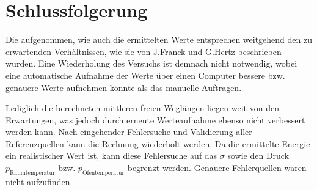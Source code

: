 \section{Schlussfolgerung}
	
	Die aufgenommen, wie auch die ermittelten Werte entsprechen weitgehend den zu erwartenden Verhältnissen, wie sie von J.Franck und G.Hertz beschrieben wurden.	 
	Eine Wiederholung des Versuchs ist demnach nicht notwendig, wobei eine automatische Aufnahme der Werte über einen Computer bessere bzw. genauere Werte aufnehmen könnte als das manuelle Auftragen. 

	Lediglich die berechneten mittleren freien Weglängen liegen weit von den Erwartungen, was jedoch durch erneute Werteaufnahme ebenso nicht verbessert werden kann.
	Nach eingehender Fehlersuche und Validierung aller Referenzquellen kann die Rechnung wiederholt werden.
	Da die ermittelte Energie ein realistischer Wert ist, kann diese Fehlersuche auf das $\sigma$ sowie den Druck $p_\text{Raumtemperatur}$ bzw. $p_\text{Ofentemperatur}$ begrenzt werden.
	Genauere Fehlerquellen waren nicht aufzufinden.
